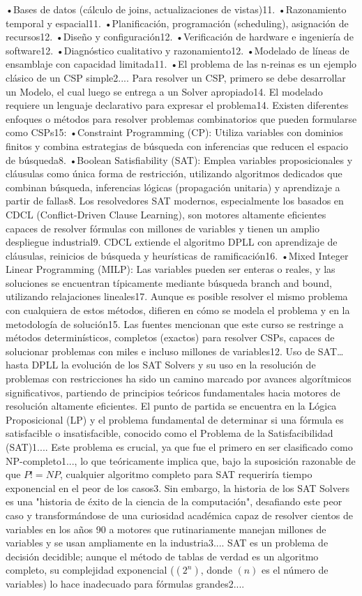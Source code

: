 •Bases de datos (cálculo de joins, actualizaciones de vistas)11.
•Razonamiento temporal y espacial11.
•Planificación, programación (scheduling), asignación de recursos12.
•Diseño y configuración12.
•Verificación de hardware e ingeniería de software12.
•Diagnóstico cualitativo y razonamiento12.
•Modelado de líneas de ensamblaje con capacidad limitada11.
•El problema de las n-reinas es un ejemplo clásico de un CSP simple2....
Para resolver un CSP, primero se debe desarrollar un Modelo, el cual luego se entrega a un Solver apropiado14. El modelado requiere un lenguaje declarativo para expresar el problema14.
Existen diferentes enfoques o métodos para resolver problemas combinatorios que pueden formularse como CSPs15:
•Constraint Programming (CP): Utiliza variables con dominios finitos y combina estrategias de búsqueda con inferencias que reducen el espacio de búsqueda8.
•Boolean Satisfiability (SAT): Emplea variables proposicionales y cláusulas como única forma de restricción, utilizando algoritmos dedicados que combinan búsqueda, inferencias lógicas (propagación unitaria) y aprendizaje a partir de fallas8. Los resolvedores SAT modernos, especialmente los basados en CDCL (Conflict-Driven Clause Learning), son motores altamente eficientes capaces de resolver fórmulas con millones de variables y tienen un amplio despliegue industrial9. CDCL extiende el algoritmo DPLL con aprendizaje de cláusulas, reinicios de búsqueda y heurísticas de ramificación16.
•Mixed Integer Linear Programming (MILP): Las variables pueden ser enteras o reales, y las soluciones se encuentran típicamente mediante búsqueda branch and bound, utilizando relajaciones lineales17.
Aunque es posible resolver el mismo problema con cualquiera de estos métodos, difieren en cómo se modela el problema y en la metodología de solución15. Las fuentes mencionan que este curso se restringe a métodos determinísticos, completos (exactos) para resolver CSPs, capaces de solucionar problemas con miles e incluso millones de variables12.
Uso de SAT…hasta DPLL
la evolución de los SAT Solvers y su uso en la resolución de problemas con restricciones ha sido un camino marcado por avances algorítmicos significativos, partiendo de principios teóricos fundamentales hacia motores de resolución altamente eficientes.
El punto de partida se encuentra en la Lógica Proposicional (LP) y el problema fundamental de determinar si una fórmula es satisfacible o insatisfacible, conocido como el Problema de la Satisfacibilidad (SAT)1.... Este problema es crucial, ya que fue el primero en ser clasificado como NP-completo1..., lo que teóricamente implica que, bajo la suposición razonable de que $P != NP$, cualquier algoritmo completo para SAT requeriría tiempo exponencial en el peor de los casos3. Sin embargo, la historia de los SAT Solvers es una "historia de éxito de la ciencia de la computación", desafiando este peor caso y transformándose de una curiosidad académica capaz de resolver cientos de variables en los años 90 a motores que rutinariamente manejan millones de variables y se usan ampliamente en la industria3.... SAT es un problema de decisión decidible; aunque el método de tablas de verdad es un algoritmo completo, su complejidad exponencial ($(2^n)$, donde $(n)$ es el número de variables) lo hace inadecuado para fórmulas grandes2....
